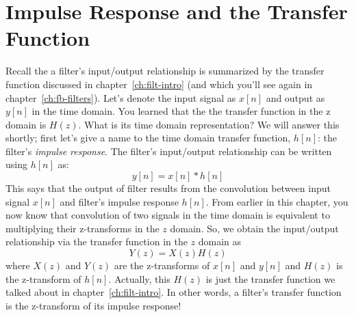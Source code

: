
\section{Impulse Response and the Transfer Function}

Recall the a filter's input/output relationship is summarized by the
transfer function discussed in chapter~\ref{ch:filt-intro} (and which
you'll see again in chapter~\ref{ch:fb-filters}). Let's denote the
input signal as $x[n]$ and output as $y[n]$ in the time domain. You
learned that the the transfer function in the z domain is $H(z)$. What
is its time domain representation? We will answer this shortly; first
let's give a name to the time domain transfer function,
$h[n]$: the filter's
\emph{impulse response}. The filter's input/output relationship can be
written using $h[n]$ as:
\begin{equation}
y[n] = x[n] \ast h[n]
\label{eq:zt-hx}
\end{equation}
This says that the output of filter results from the convolution
between input signal $x[n]$ and filter's impulse response $h[n]$. From
earlier in this chapter, you now know that convolution of two signals
in the time domain is equivalent to multiplying their z-transforms in
the $z$ domain. So, we obtain the input/output relationship via the
transfer function in the $z$ domain as
\begin{equation}
Y(z) =X(z)H(z)
\label{eq:zt-HX}
\end{equation}
where $X(z)$ and $Y(z)$ are the z-transforms of $x[n]$ and $y[n]$ and
$H(z)$ is the z-transform of $h[n]$.  Actually, this $H(z)$ is just
the transfer function we talked about in chapter~\ref{ch:filt-intro}.
In other words, a filter's transfer function is the z-transform of its
impulse response!

